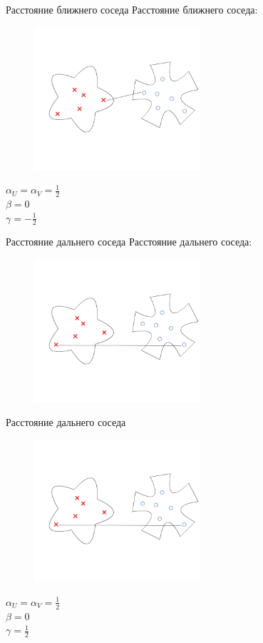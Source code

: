\documentclass[10pt]{beamer}
\begin{document}
\begin{frame}{Расстояние ближнего соседа}
	Расстояние ближнего соседа:\\
	\begin{figure}[htbp]
	  \includegraphics[height=150pt, keepaspectratio = true]{images/lans1}  
	\end{figure}
	${\alpha_U = \alpha_V = \frac{1}{2}}$ \\${\beta = 0}$ \\${\gamma = -\frac{1}{2}}$
\end{frame}

\begin{frame}{Расстояние дальнего соседа}
	Расстояние дальнего соседа:\\
	\begin{figure}[htbp]
	  \includegraphics[height=150pt, keepaspectratio = true]{images/lans2}  
	\end{figure}
\end{frame}

\begin{frame}{Расстояние дальнего соседа}
	\begin{figure}[htbp]
	  \includegraphics[height=150pt, keepaspectratio = true]{images/lans2}  
	\end{figure}
	${\alpha_U = \alpha_V = \frac{1}{2}}$ \\${\beta = 0}$ \\${\gamma = \frac{1}{2}}$
\end{frame}
\end{document}
